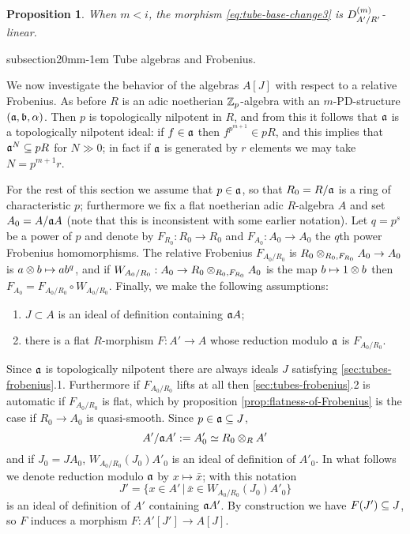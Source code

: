 \documentclass{article}
\makeatletter
\theoremstyle{change}
\newtheorem{prop}[subsubsection]{Proposition}
\renewcommand{\subsection}{\@startsection%
{subsection}{2}{0mm}{\baselineskip}{-1em}%
{\normalfont\normalsize\bfseries}}
\numberwithin{equation}{subsubsection}
\newcommand{\demobox}{\vrule height6pt width6pt depth0pt}
\newcommand{\nodemo}{\unskip\nobreak\hfil\qquad
\demobox\parfillskip=0pt\par}
\makeatother
\begin{document}
\begin{prop}\label{prop:Dm-linearity-of-tube-base-change}
  When $m<i$, the morphism \ref{eq:tube-base-change3} is
  ${D}^{({m})}_{A'/R'}$-linear.\nodemo
\end{prop}

\subsection{Tube algebras and Frobenius.}
\label{sec:tubes-frobenius}

We now investigate the behavior of the algebras $A[J]$ with respect to
a relative Frobenius. As before $R$ is an adic noetherian
${\mathbb Z}_p$-algebra with an $m$-PD-structure $({\mathfrak a},{\mathfrak b},\alpha)$. Then $p$
is topologically nilpotent in $R$, and from this it follows that ${\mathfrak a}$
is a topologically nilpotent ideal: if $f\in{\mathfrak a}$ then
$f^{p^{m+1}}\in pR$, and this implies that ${\mathfrak a}^N\subseteq pR$ for
$N\gg0$; in fact if ${\mathfrak a}$ is generated by $r$ elements we may take
$N=p^{m+1}r$.

For the rest of this section we assume that $p\in{\mathfrak a}$, so that
$R_0=R/{\mathfrak a}$ is a ring of characteristic $p$; furthermore we fix a flat
noetherian adic $R$-algebra $A$ and set $A_0=A/{\mathfrak a} A$ (note that this
is inconsistent with some earlier notation). Let $q=p^s$ be a power of
$p$ and denote by $F_{R_0}:R_0\to R_0$ and $F_{A_0}:A_0\to A_0$ the
$q$th power Frobenius homomorphisms. The relative Frobenius
$F_{A_0/R_0}$ is $R_0\otimes_{R_0,F_{R_0}}A_0\to A_0$ is
$a\otimes b\mapsto ab^q$, and if
$W_{A_0/R_0}:A_0\to R_0\otimes_{R_0,F_{R_0}}A_0$ is the map
$b\mapsto 1\otimes b$ then $F_{A_0}=F_{A_0/R_0}\circ
W_{A_0/R_0}$. Finally, we make the following assumptions:
\begin{enumerate}
\item $J\subset A$ is an ideal of definition containing ${\mathfrak a} A$;
\item there is a flat $R$-morphism $F:A'\to A$ whose reduction modulo
  ${\mathfrak a}$ is $F_{A_0/R_0}$.
\end{enumerate}
Since ${\mathfrak a}$ is topologically nilpotent there are always ideals $J$
satisfying \ref{sec:tubes-frobenius}.1. Furthermore if $F_{A_0/R_0}$
lifts at all then \ref{sec:tubes-frobenius}.2 is automatic if
$F_{A_0/R_0}$ is flat, which by proposition
\ref{prop:flatness-of-Frobenius} is the case if $R_0\to A_0$ is
quasi-smooth. Since $p\in{\mathfrak a}\subseteq J$,
\begin{displaymath}
  A'/{\mathfrak a} A':=A'_0\simeq R_0\otimes_RA'
\end{displaymath}
and if $J_0=JA_0$, $W_{A_0/R_0}(J_0)A'_0$ is an ideal of definition of
$A'_0$. In what follows we denote reduction modulo ${\mathfrak a}$ by
$x\mapsto\bar x$; with this notation
\begin{displaymath}
  J'=\{x\in A'\,|\, \bar x\in W_{A_0/R_0}(J_0)A'_0\}
\end{displaymath}
is an ideal of definition of $A'$ containing ${\mathfrak a} A'$. By construction
we have $F(J')\subseteq J$, so $F$ induces a morphism $F:A'[J']\to A[J]$.
\end{document}
